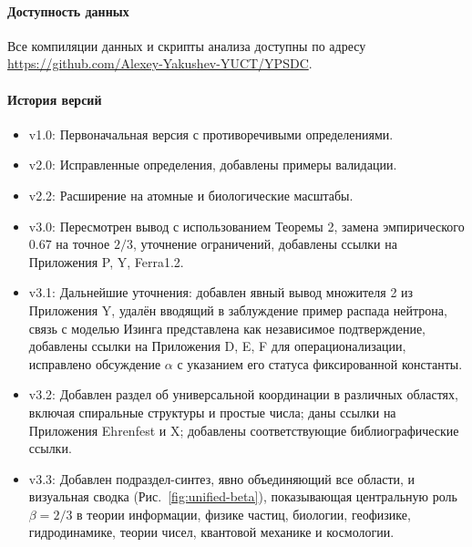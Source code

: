 \documentclass[12pt]{article}
\begin{document}
	\paragraph*{Доступность данных}
	Все компиляции данных и скрипты анализа доступны по адресу \url{https://github.com/Alexey-Yakushev-YUCT/YPSDC}.
	
	\paragraph*{История версий}
	\begin{itemize}
		\item v1.0: Первоначальная версия с противоречивыми определениями.
		\item v2.0: Исправленные определения, добавлены примеры валидации.
		\item v2.2: Расширение на атомные и биологические масштабы.
		\item v3.0: Пересмотрен вывод с использованием Теоремы 2, замена эмпирического \(0.67\) на точное \(2/3\), уточнение ограничений, добавлены ссылки на Приложения P, Y, Ferra1.2.
		\item v3.1: Дальнейшие уточнения: добавлен явный вывод множителя 2 из Приложения Y, удалён вводящий в заблуждение пример распада нейтрона, связь с моделью Изинга представлена как независимое подтверждение, добавлены ссылки на Приложения D, E, F для операционализации, исправлено обсуждение \(\alpha\) с указанием его статуса фиксированной константы.
		\item v3.2: Добавлен раздел об универсальной координации в различных областях, включая спиральные структуры и простые числа; даны ссылки на Приложения Ehrenfest и X; добавлены соответствующие библиографические ссылки.
		\item v3.3: Добавлен подраздел-синтез, явно объединяющий все области, и визуальная сводка (Рис.~\ref{fig:unified-beta}), показывающая центральную роль \(\beta = 2/3\) в теории информации, физике частиц, биологии, геофизике, гидродинамике, теории чисел, квантовой механике и космологии.
	\end{itemize}
	
\end{document}
